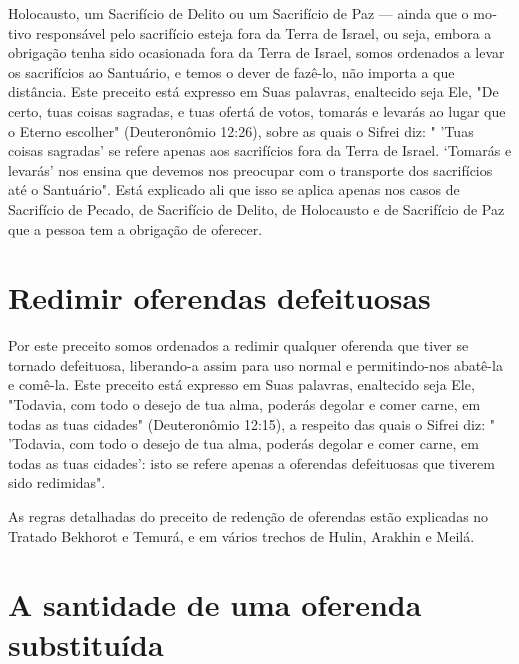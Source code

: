 \begin{itemize}
\begin{enumrate}
\begin{itemize}
\begin{itemize}
\begin{enumerate}
\end{enumerate}

Holocausto, um Sacrifício de Delito ou um Sacrifício de Paz --- ainda
que o mo­tivo responsável pelo sacrifício esteja fora da Terra de
Israel, ou seja, embora a obrigação tenha sido ocasionada fora da Terra
de Israel, somos ordenados a levar os sacrifícios ao Santuário, e temos
o dever de fazê-lo, não importa a que distância. Este preceito está
expresso em Suas palavras, enaltecido seja Ele, "De certo, tuas coisas
sagradas, e tuas ofertá de votos, tomarás e levarás ao lugar que o
Eterno escolher" (Deuteronômio 12:26), sobre as quais o Sifrei diz: "
'Tuas coisas sagradas' se refere apenas aos sacrifícios fora da Terra de
Israel. `Tomarás e levarás' nos ensina que devemos nos preocupar com o
transporte dos sacrifícios até o Santuário". Está explicado ali que isso
se aplica apenas nos casos de Sacrifício de Pecado, de Sacrifício de
Delito, de Holocausto e de Sacri­fício de Paz que a pessoa tem a
obrigação de oferecer.


\section{Redimir oferendas defeituosas}


Por este preceito somos ordenados a redimir qualquer oferenda que tiver
se tornado defeituosa, liberando-a assim para uso normal e
permitindo-nos abatê-la e comê-la. Este preceito está expresso em Suas
palavras, enaltecido seja Ele, "Todavia, com todo o desejo de tua alma,
poderás degolar e comer carne, em todas as tuas cidades" (Deuteronômio
12:15), a respeito das quais o Sifrei diz: " 'Todavia, com todo o desejo
de tua alma, poderás degolar e co­mer carne, em todas as tuas cidades':
isto se refere apenas a oferendas defeituo­sas que tiverem sido
redimidas".

As regras detalhadas do preceito de redenção de oferendas estão
ex­plicadas no Tratado Bekhorot e Temurá, e em vários trechos de Hulin,
Arakhin e Meilá.

\section{A santidade de uma oferenda substituída}


\end{itemize}
\end{itemize}
\end{enumrate}
\end{itemize}
